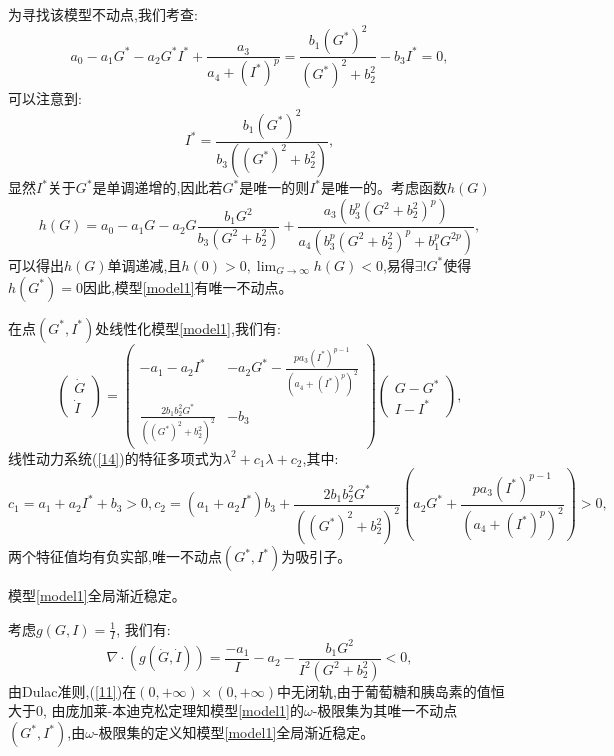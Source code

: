 \begin{pf}
    为寻找该模型不动点,我们考查:
    \begin{equation}
        a_0-a_1G^*-a_2G^*I^*+\frac{a_3}{a_4+(I^*)^p}= \frac{b_1 (G^*)^2}{(G^*)^2 + b_2^2} - b_3 I^*=0,
    \end{equation}
    可以注意到:
    \begin{equation}
        I^*=\frac{b_1 (G^*)^2}{b_3((G^*)^2 + b_2^2)},
    \end{equation}
    显然$I^*$关于$G^*$是单调递增的,因此若$G^*$是唯一的则$I^*$是唯一的。考虑函数$h(G)$
    \begin{equation}
        h(G)=a_0-a_1G-a_2G\frac{b_1G^2}{b_3(G^2+b_2^2)}+\frac{a_3(b_3^p(G^2+b_2^2)^p)}{a_4(b_3^p(G^2+b_2^2)^p+b_1^pG^{2p})},
    \end{equation}
    可以得出$h(G)$单调递减,且$h(0)>0,\lim_{G\to\infty}h(G)<0$,易得$\exists !G^*$使得$h(G^*)=0$因此,模型\ref{model1}有唯一不动点。

    在点$(G^*,I^*)$处线性化模型\ref{model1},我们有:
    \begin{equation}\label{14}
        \begin{pmatrix}
            \dot{G} \\
            \dot{I}
        \end{pmatrix}=\begin{pmatrix}
            -a_1-a_2I^*                              & -a_2G^*-\frac{pa_3(I^*)^{p-1}}{(a_4+(I^*)^p)^2} \\
            \frac{2b_1b_2^2G^*}{((G^*)^2 + b_2^2)^2} & -b_3
        \end{pmatrix}\begin{pmatrix}
            G-G^* \\
            I-I^*
        \end{pmatrix},
    \end{equation}
    线性动力系统(\ref{14})的特征多项式为$\lambda^2+c_1\lambda+c_2$,其中:
    \begin{equation*}
        c_1=a_1+a_2I^*+b_3>0, c_2=(a_1+a_2I^*)b_3+\frac{2b_1b_2^2G^*}{((G^*)^2 + b_2^2)^2}(a_2G^*+\frac{pa_3(I^*)^{p-1}}{(a_4+(I^*)^p)^2})>0,
    \end{equation*}
    两个特征值均有负实部,唯一不动点$(G^*,I^*)$为吸引子\cite{strogatz2018nonlinear}。

\end{pf}
\begin{prop}\label{prop2}
    模型\ref{model1}全局渐近稳定。
\end{prop}
\begin{pf}
    考虑$g(G,I)=\frac{1}{I}$, 我们有:
    \begin{equation}
        \nabla\cdot(g(\dot{G},\dot{I}))=\frac{-a_1}{I}-a_2-\frac{b_1 G^2}{I^2(G^2 + b_2^2)}<0,
    \end{equation}
    由Dulac准则,(\ref{11})在$(0,+\infty)\times (0,+\infty)$中无闭轨,由于葡萄糖和胰岛素的值恒大于$0$, 由庞加莱-本迪克松定理知模型\ref{model1}的$\omega$-极限集为其唯一不动点$(G^*,I^*)$,由$\omega$-极限集的定义知模型\ref{model1}全局渐近稳定。
\end{pf}

